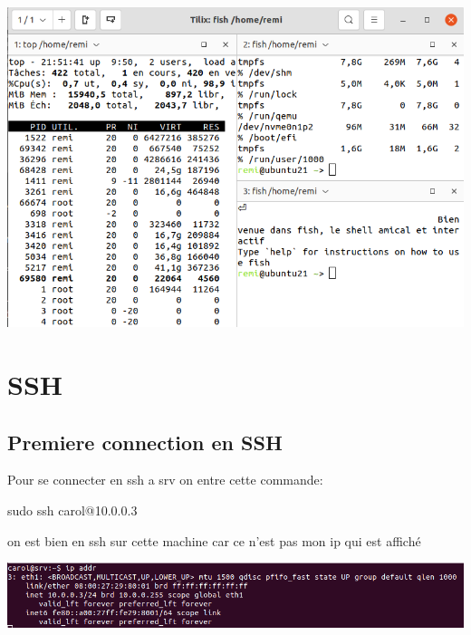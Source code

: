 \documentclass{article}
\begin{document}
 \begin{center}
        \includegraphics[scale=0.6]{Images/tilix.png}
 \end{center}
 
 
 \newpage
 
 
 \section{\huge{SSH}}
 
 
 \subsection{\large{Premiere connection en SSH}}
 Pour se connecter en ssh a srv on entre cette commande: \par sudo ssh carol@10.0.0.3 \par
 on est bien en ssh sur cette machine car ce n'est pas mon ip qui est affiché
 
 \begin{center}
        \includegraphics[scale=0.47]{Images/ssh.png}
 \end{center}
 
\end{document}
